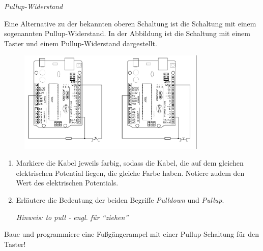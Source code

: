 \begin{aufgabe} \emph{Pullup-Widerstand}
	
	Eine Alternative zu der bekannten oberen Schaltung ist die Schaltung mit einem sogenannten Pullup-Widerstand. In der Abbildung ist die Schaltung mit einem Taster und einem Pullup-Widerstand dargestellt.
	
	\begin{figure}[H]
		\centering
		\includegraphics[width=0.8\textwidth]{./Zeichnungen/schaltplan-pullup.png}
	\end{figure}
	
	\begin{enumerate}[label=\alph*), itemsep=0ex, parsep=0ex]
		\item Markiere die Kabel jeweils farbig, sodass die Kabel, die auf dem gleichen elektrischen Potential liegen, die gleiche Farbe haben. Notiere zudem den Wert des elektrischen Potentials.
		\item Erläutere die Bedeutung der beiden Begriffe \emph{Pulldown} und \emph{Pullup}.
		
		\emph{Hinweis: to pull - engl. für \enquote{ziehen}}
	\end{enumerate}
\end{aufgabe}

\bigskip
\begin{projekt}\label{proj:fussampel2}
	Baue und programmiere eine Fußgängerampel mit einer Pullup-Schaltung für den Taster!
\end{projekt}

